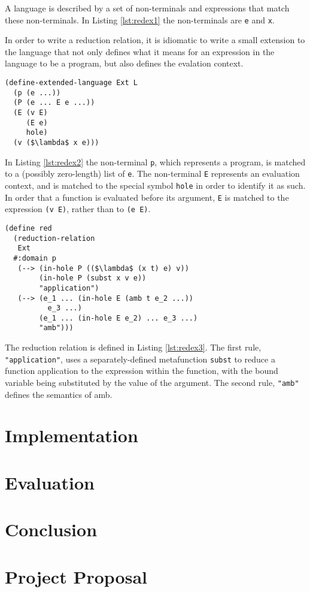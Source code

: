 \documentclass[12pt,a4paper,twoside,openright]{report}
\begin{document}
A language is described by a set of non-terminals and expressions that match these non-terminals. In Listing \ref{lst:redex1} the non-terminals are \texttt{e} and \texttt{x}.

In order to write a reduction relation, it is idiomatic to write a small extension to the language that not only defines what it means for an expression in the language to be a program, but also defines the evalation context.

\begin{lstlisting}[caption=An extended language based on L,label={lst:redex2}]
(define-extended-language Ext L
  (p (e ...))
  (P (e ... E e ...))
  (E (v E)
     (E e)
     hole)
  (v ($\lambda$ x e)))
\end{lstlisting}

In Listing \ref{lst:redex2} the non-terminal \texttt{p}, which represents a program, is matched to a (possibly zero-length) list of \texttt{e}. The non-terminal \texttt{E} represents an evaluation context, and is matched to the special symbol \texttt{hole} in order to identify it as such. In order that a function is evaluated before its argument, \texttt{E} is matched to the expression \texttt{(v E)}, rather than to \texttt{(e E)}.

\begin{lstlisting}[caption=Defining a reduction relation in PLT Redex,label={lst:redex3}]
(define red
  (reduction-relation
   Ext
  #:domain p
   (--> (in-hole P (($\lambda$ (x t) e) v))
        (in-hole P (subst x v e))
        "application")
   (--> (e_1 ... (in-hole E (amb t e_2 ...)) 
          e_3 ...)
        (e_1 ... (in-hole E e_2) ... e_3 ...)
        "amb")))
\end{lstlisting}

The reduction relation is defined in Listing \ref{lst:redex3}. The first rule, \texttt{"application"}, uses a separately-defined metafunction \texttt{subst} to reduce a function application to the expression within the function, with the bound variable being substituted by the value of the argument. The second rule, \texttt{"amb"} defines the semantics of amb.

\chapter{Implementation}

\chapter{Evaluation}

\chapter{Conclusion}


\appendix

\chapter{Project Proposal}
\end{document}
